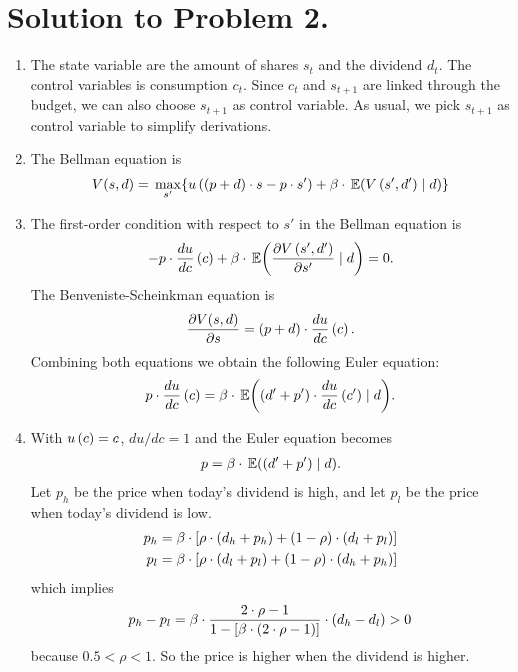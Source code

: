 \documentclass[letterpaper,12pt,leqno]{article}
\begin{document}
\section*{Solution to Problem 2.}

\begin{enumerate}
\item The state variable are the amount of shares $s_{t}$ and the dividend $d_{t}$.  The
control variables is consumption $c_{t}$. Since $c_{t}$ and $s_{t+1}$ are linked through the budget, we can also choose $s_{t+1}$ as control variable. As usual, we pick $s_{t+1}$ as control variable to simplify derivations.
\item The Bellman equation is 
\begin{align*}
V(s,d) = \max[s']{u\bp{\bp{p+d}\cdot s-p\cdot s'} +\b \cdot\E{V\bp{s',d'} \mid d}}
\end{align*}
\item The first-order condition with respect to $s'$ in the Bellman equation is
\begin{align*}
-p\cdot \od{u}{c}\bp{c} +\b \cdot \E{\pd{V\bp{s',d'}}{s'} \mid d} =0.
\end{align*}
The Benveniste-Scheinkman equation is
\begin{align*}
\frac{\partial V(s,d)}{\partial s} =\left( p+d \right) \cdot \frac{d u}{d c}\left( c \right).
\end{align*}
Combining both equations we obtain the following Euler equation:
\begin{align*}
p\cdot \od{u}{c}\bp{c} =\b \cdot \E{\bp{d'+p'}\cdot  \od{u}{c}\bp{c'} \mid d} .
\end{align*}

\item With $u\left( c \right) =c$, $du/dc=1$ and the Euler equation becomes 
\begin{align*}
p=\b \cdot \E{\bp{d'+p'} \mid d} .
\end{align*}
Let $p_{h}$ be the price when today's dividend is high, and let $p_{l}$ be the price when today's dividend is low.
\begin{align*}
p_{h} &=\beta \cdot \left[ \rho\cdot  \left( d_{h}+p_{h} \right) +\left( 1-\rho \right)\cdot \left( d_{l}+p_{l} \right) \right] \\
p_{l} &=\beta \cdot \left[ \rho \cdot \left( d_{l}+p_{l} \right) +\left( 1-\rho \right)\cdot \left( d_{h}+p_{h} \right) \right]
\end{align*}
which implies
\begin{align*}
p_{h}-p_{l}=\beta\cdot \frac{2\cdot \rho -1 }{1-\left[ \beta \cdot \left( 2\cdot \rho -1 \right) \right]}\cdot \left( d_{h}-d_{l} \right)>0
\end{align*}
because $0.5<\rho<1$. So the price is higher when the dividend is higher.
\end{enumerate}
\end{document}
